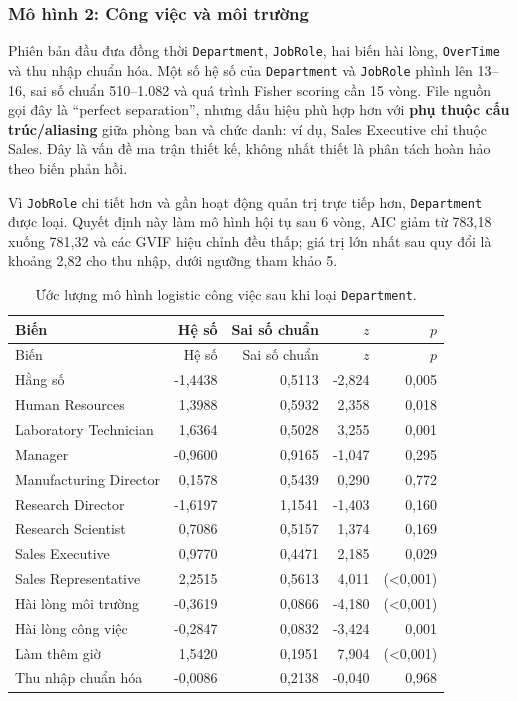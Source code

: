 \subsubsection{Mô hình 2: Công việc và môi trường}

Phiên bản đầu đưa đồng thời \texttt{Department}, \texttt{JobRole}, hai
biến hài lòng, \texttt{OverTime} và thu nhập chuẩn hóa. Một số hệ số của
\texttt{Department} và \texttt{JobRole} phình lên 13--16, sai số chuẩn
510--1.082 và quá trình Fisher scoring cần 15 vòng. File nguồn gọi đây
là ``perfect separation'', nhưng dấu hiệu phù hợp hơn với
\textbf{phụ thuộc cấu trúc/aliasing} giữa phòng ban và chức danh: ví dụ,
Sales Executive chỉ thuộc Sales. Đây là vấn đề ma trận thiết kế, không
nhất thiết là phân tách hoàn hảo theo biến phản hồi.

Vì \texttt{JobRole} chi tiết hơn và gần hoạt động quản trị trực tiếp
hơn, \texttt{Department} được loại. Quyết định này làm mô hình hội tụ
sau 6 vòng, AIC giảm từ 783,18 xuống 781,32 và các GVIF hiệu chỉnh đều
thấp; giá trị lớn nhất sau quy đổi là khoảng 2,82 cho thu nhập, dưới
ngưỡng tham khảo 5.

\begin{longtable}{lrrrr}
\caption{Ước lượng mô hình logistic công việc sau khi loại
\texttt{Department}.}\label{tab:hr-model2}\\
\toprule
Biến & Hệ số & Sai số chuẩn & \(z\) & \(p\)\\
\midrule
\endfirsthead
\toprule
Biến & Hệ số & Sai số chuẩn & \(z\) & \(p\)\\
\midrule
\endhead
Hằng số & -1,4438 & 0,5113 & -2,824 & 0,005\\
Human Resources & 1,3988 & 0,5932 & 2,358 & 0,018\\
Laboratory Technician & 1,6364 & 0,5028 & 3,255 & 0,001\\
Manager & -0,9600 & 0,9165 & -1,047 & 0,295\\
Manufacturing Director & 0,1578 & 0,5439 & 0,290 & 0,772\\
Research Director & -1,6197 & 1,1541 & -1,403 & 0,160\\
Research Scientist & 0,7086 & 0,5157 & 1,374 & 0,169\\
Sales Executive & 0,9770 & 0,4471 & 2,185 & 0,029\\
Sales Representative & 2,2515 & 0,5613 & 4,011 & (<0,001)\\
Hài lòng môi trường & -0,3619 & 0,0866 & -4,180 & (<0,001)\\
Hài lòng công việc & -0,2847 & 0,0832 & -3,424 & 0,001\\
Làm thêm giờ & 1,5420 & 0,1951 & 7,904 & (<0,001)\\
Thu nhập chuẩn hóa & -0,0086 & 0,2138 & -0,040 & 0,968\\
\bottomrule
\end{longtable}

